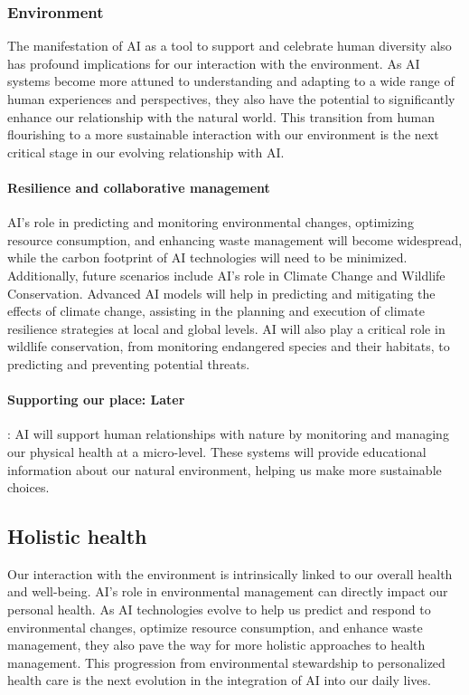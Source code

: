 \subsubsection{Environment}
The manifestation of AI as a tool to support and celebrate human diversity also has profound implications for our interaction with the environment. As AI systems become more attuned to understanding and adapting to a wide range of human experiences and perspectives, they also have the potential to significantly enhance our relationship with the natural world. This transition from human flourishing to a more sustainable interaction with our environment is the next critical stage in our evolving relationship with AI.
\paragraph{Resilience and collaborative management} 
AI's role in predicting and monitoring environmental changes, optimizing resource consumption, and enhancing waste management will become widespread, while the carbon footprint of AI technologies will need to be minimized. Additionally, future scenarios include AI's role in Climate Change and Wildlife Conservation. Advanced AI models will help in predicting and mitigating the effects of climate change, assisting in the planning and execution of climate resilience strategies at local and global levels. AI will also play a critical role in wildlife conservation, from monitoring endangered species and their habitats, to predicting and preventing potential threats. 

\paragraph{Supporting our place: Later}: 
AI will support human relationships with nature by monitoring and managing our physical health at a micro-level. These systems will provide educational information about our natural environment, helping us make more sustainable choices.
\subsection{Holistic health}
Our interaction with the environment is intrinsically linked to our overall health and well-being. AI’s role in environmental management can directly impact our personal health. As AI technologies evolve to help us predict and respond to environmental changes, optimize resource consumption, and enhance waste management, they also pave the way for more holistic approaches to health management. This progression from environmental stewardship to personalized health care is the next evolution in the integration of AI into our daily lives.
